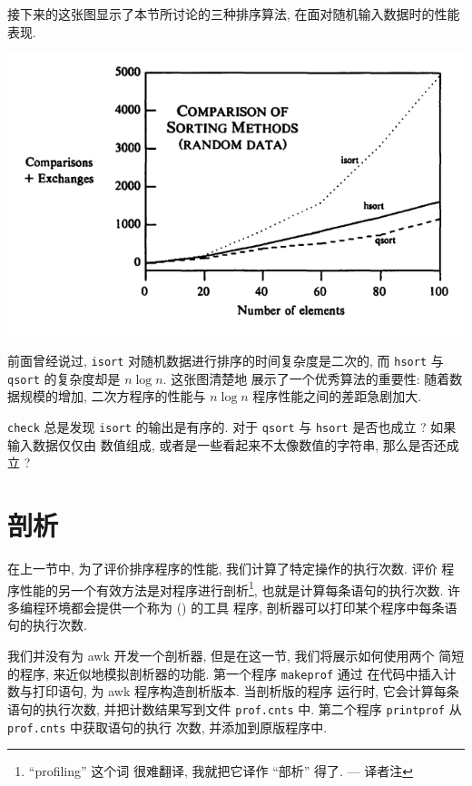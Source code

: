 接下来的这张图显示了本节所讨论的三种排序算法, 在面对随机输入数据时的性能
表现.
\begin{center}
    \includegraphics[scale=0.7]{images/sort_cmp.png}
\end{center}

前面曾经说过, \texttt{isort} 对随机数据进行排序的时间复杂度是二次的, 而
\texttt{hsort} 与 \texttt{qsort} 的复杂度却是 $n \log n$. 这张图清楚地
展示了一个优秀算法的重要性: 随着数据规模的增加, 二次方程序的性能与
$n \log n$ 程序性能之间的差距急剧加大.
\begin{exercise}
    \texttt{check} 总是发现 \texttt{isort} 的输出是有序的. 对于
    \texttt{qsort} 与 \texttt{hsort} 是否也成立 ? 如果输入数据仅仅由
    数值组成, 或者是一些看起来不太像数值的字符串, 那么是否还成立 ?
\end{exercise}

\section{剖析}
\label{sec:profiling}

在上一节中, 为了评价排序程序的性能, 我们计算了特定操作的执行次数. 评价
程序性能的另一个有效方法是对程序进行剖析\footnote{``profiling'' 这个词 
很难翻译, 我就把它译作 ``部析'' 得了. --- 译者注},
也就是计算每条语句的执行次数.
许多编程环境都会提供一个称为  () 的工具
程序, 剖析器可以打印某个程序中每条语句的执行次数.

我们并没有为 awk 开发一个剖析器, 但是在这一节, 我们将展示如何使用两个
简短的程序, 来近似地模拟剖析器的功能. 第一个程序  \texttt{makeprof} 通过 
在代码中插入计数与打印语句, 为 awk 程序构造剖析版本. 当剖析版的程序
运行时, 它会计算每条语句的执行次数, 并把计数结果写到文件 \texttt{prof.cnts}
中. 第二个程序 \texttt{printprof} 从 \texttt{prof.cnts} 中获取语句的执行
次数, 并添加到原版程序中.


